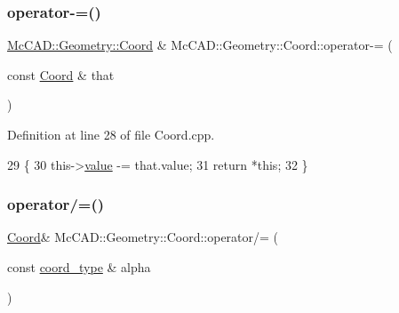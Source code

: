 \mbox{\label{classMcCAD_1_1Geometry_1_1Coord_a429664d7f992603cd6a52a056b769abc}} 
\subsubsection{\texorpdfstring{operator-\/=()}{operator-=()}\hspace{0.1cm}{\footnotesize\ttfamily [2/2]}}
{\footnotesize\ttfamily \hyperlink{classMcCAD_1_1Geometry_1_1Coord}{Mc\+C\+A\+D\+::\+Geometry\+::\+Coord} \& Mc\+C\+A\+D\+::\+Geometry\+::\+Coord\+::operator-\/= (\begin{DoxyParamCaption}\item[{const \hyperlink{classMcCAD_1_1Geometry_1_1Coord}{Coord} \&}]{that }\end{DoxyParamCaption})}



Definition at line 28 of file Coord.\+cpp.


\begin{DoxyCode}
29                           \{
30     this->\hyperlink{classMcCAD_1_1Geometry_1_1Coord_a540aea93d3b1a9cfd505e1e0b96b2b91}{value} -= that.value;
31     \textcolor{keywordflow}{return} *\textcolor{keyword}{this};
32 \}
\end{DoxyCode}
\mbox{\label{classMcCAD_1_1Geometry_1_1Coord_ad031f99a1b4ddb6142c6b6e641ba0757}} 
\subsubsection{\texorpdfstring{operator/=()}{operator/=()}\hspace{0.1cm}{\footnotesize\ttfamily [1/2]}}
{\footnotesize\ttfamily \hyperlink{classMcCAD_1_1Geometry_1_1Coord}{Coord}\& Mc\+C\+A\+D\+::\+Geometry\+::\+Coord\+::operator/= (\begin{DoxyParamCaption}\item[{const \hyperlink{namespaceMcCAD_1_1Geometry_ac043b37a4a7e849fca22869e1982d2f8}{coord\+\_\+type} \&}]{alpha }\end{DoxyParamCaption})}

